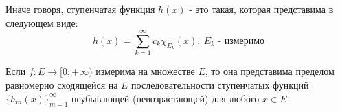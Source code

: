 \begin{note}
	Иначе говоря, ступенчатая функция $h(x)$ - это такая, которая представима в следующем виде:
	\[
		h(x) = \sum_{k = 1}^\infty c_k \chi_{E_k}(x),\ E_k \text{ - измеримо}
	\]
\end{note}

\begin{theorem}
	Если $f \colon E \to [0; +\infty)$ измерима на множестве $E$, то она представима пределом равномерно сходящейся на $E$ последовательности ступенчатых функций $\{h_m(x)\}_{m = 1}^\infty$ неубывающей (невозрастающей) для любого $x \in E$.
\end{theorem}